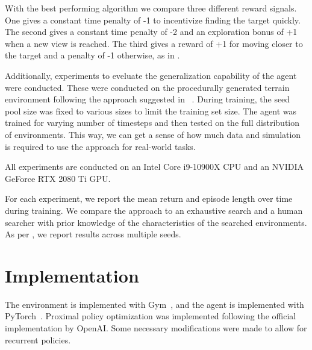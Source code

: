 With the best performing algorithm we compare three different reward signals.
One gives a constant time penalty of -1 to incentivize finding the target quickly.
The second gives a constant time penalty of -2 and an exploration bonus of +1 when a new view is reached.
The third gives a reward of +1 for moving closer to the target and a penalty of -1 otherwise, as in \cite{caicedo_active_2015}.

Additionally, experiments to eveluate the generalization capability of the agent were conducted.
These were conducted on the procedurally generated terrain environment following the approach suggested in ~\cite{procgen}.
During training, the seed pool size was fixed to various sizes to limit the training set size.
The agent was trained for varying number of timesteps and then tested on the full distribution of environments.
This way, we can get a sense of how much data and simulation is required to use the approach for real-world tasks.

All experiments are conducted on an Intel Core i9-10900X CPU and an NVIDIA GeForce RTX 2080 Ti GPU.

For each experiment, we report the mean return and episode length over time during training.
We compare the approach to an exhaustive search and a human searcher with prior knowledge of the characteristics of the searched environments.
As per \cite{agarwal_rlliable_2022}, we report results across multiple seeds.



\section{Implementation}

The environment is implemented with Gym~\cite{brockman_gym_2016}, and the agent is implemented with PyTorch~\cite{paszke_pytorch_nodate}.
Proximal policy optimization was implemented following the official implementation by OpenAI.
Some necessary modifications were made to allow for recurrent policies.




